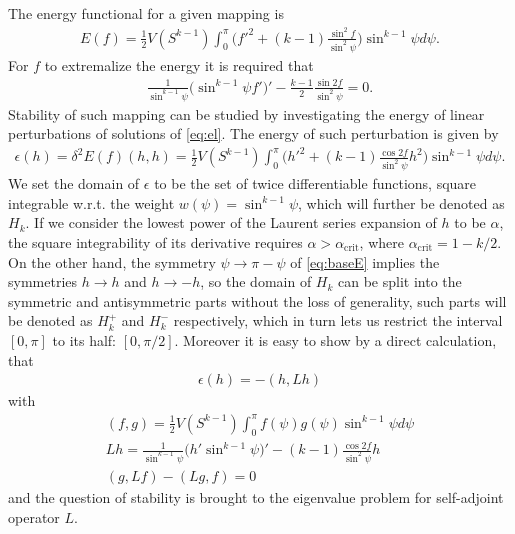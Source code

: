 \documentclass[
a4paper,%
10pt,%
titlepage,%
twoside%
]{article}
\begin{document}
The energy functional for a given mapping is
\begin{gather}\label{eq:baseE}
  E(f)=\frac{1}{2}V(S^{k-1})\int_0^{\pi}\bigg(f'^2+(k-1)\frac{\sin^2f}{\sin^2\psi}\bigg)\sin^{k-1}\psi d\psi.
\end{gather}
For $f$ to extremalize the energy it is required that
\begin{gather}\label{eq:el}
  \frac{1}{\sin^{k-1}\psi}\big(\sin^{k-1}\psi f'\big)'-\frac{k-1}{2}\frac{\sin 2 f}{\sin^2\psi}=0.
\end{gather}
Stability of such mapping can be studied by investigating the energy
of linear perturbations of solutions of \eqref{eq:el}. The energy of
such perturbation is given by
\begin{gather}\label{eq:infE}
  \epsilon(h)=\delta^2E(f)(h,h)=\frac{1}{2}V(S^{k-1})\int_0^{\pi}\bigg(h'^2+(k-1)\frac{\cos 2f}{\sin^2\psi }h^2\bigg)\sin^{k-1}\psi d\psi.
\end{gather}
We set the domain of $\epsilon$ to be the set of twice differentiable
functions, square integrable w.r.t. the weight
$w(\psi)=\sin^{k-1}\psi$, which will further be denoted as $H_k$. If
we consider the lowest power of the Laurent series expansion of $h$ to
be $\alpha$, the square integrability of its derivative requires
$\alpha>\alpha_{\text{crit}}$, where $\alpha_{\text{crit}}=1-k/2$. On
the other hand, the symmetry $\psi\rightarrow\pi-\psi$ of
\eqref{eq:baseE} implies the symmetries $h\rightarrow h$ and
$h\rightarrow-h$, so the domain of $H_k$ can be split into the
symmetric and antisymmetric parts without the loss of generality, such
parts will be denoted as $H^+_k$ and $H^-_k$ respectively, which in
turn lets us restrict the interval $[0,\pi]$ to its half:
$[0,\pi/2]$. Moreover it is easy to show by a direct calculation, that
\begin{gather}
  \epsilon(h)=-(h,Lh)
\end{gather}
with
\begin{gather}
  (f,g)=\frac{1}{2}V(S^{k-1})\int_0^\pi f(\psi) g(\psi) \sin^{k-1}\psi d\psi\\
  Lh=\frac{1}{\sin^{k-1}\psi}\big(h'\sin^{k-1}\psi\big)'-(k-1)\frac{\cos 2 f}{\sin^2\psi}h\\
  (g,Lf)-(Lg,f)=0
\end{gather}
and the question of stability is brought to the eigenvalue problem for
self-adjoint operator $L$.\\
\end{document}
